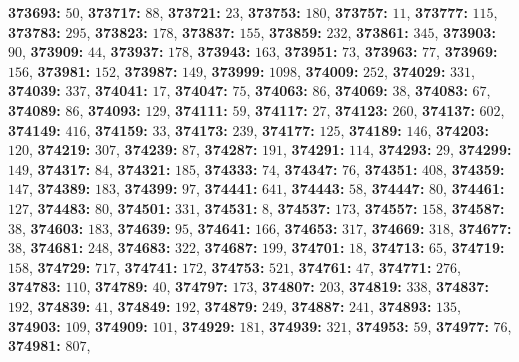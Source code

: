 \textsf{\bfseries 373693:} $50$, \textsf{\bfseries 373717:} $88$, \textsf{\bfseries 373721:} $23$, \textsf{\bfseries 373753:} $180$, \textsf{\bfseries 373757:} $11$, \textsf{\bfseries 373777:} $115$, \textsf{\bfseries 373783:} $295$, \textsf{\bfseries 373823:} $178$, \textsf{\bfseries 373837:} $155$, \textsf{\bfseries 373859:} $232$, \textsf{\bfseries 373861:} $345$, \textsf{\bfseries 373903:} $90$, \textsf{\bfseries 373909:} $44$, \textsf{\bfseries 373937:} $178$, \textsf{\bfseries 373943:} $163$, \textsf{\bfseries 373951:} $73$, \textsf{\bfseries 373963:} $77$, \textsf{\bfseries 373969:} $156$, \textsf{\bfseries 373981:} $152$, \textsf{\bfseries 373987:} $149$, \textsf{\bfseries 373999:} $1098$, \textsf{\bfseries 374009:} $252$, \textsf{\bfseries 374029:} $331$, \textsf{\bfseries 374039:} $337$, \textsf{\bfseries 374041:} $17$, \textsf{\bfseries 374047:} $75$, \textsf{\bfseries 374063:} $86$, \textsf{\bfseries 374069:} $38$, \textsf{\bfseries 374083:} $67$, \textsf{\bfseries 374089:} $86$, \textsf{\bfseries 374093:} $129$, \textsf{\bfseries 374111:} $59$, \textsf{\bfseries 374117:} $27$, \textsf{\bfseries 374123:} $260$, \textsf{\bfseries 374137:} $602$, \textsf{\bfseries 374149:} $416$, \textsf{\bfseries 374159:} $33$, \textsf{\bfseries 374173:} $239$, \textsf{\bfseries 374177:} $125$, \textsf{\bfseries 374189:} $146$, \textsf{\bfseries 374203:} $120$, \textsf{\bfseries 374219:} $307$, \textsf{\bfseries 374239:} $87$, \textsf{\bfseries 374287:} $191$, \textsf{\bfseries 374291:} $114$, \textsf{\bfseries 374293:} $29$, \textsf{\bfseries 374299:} $149$, \textsf{\bfseries 374317:} $84$, \textsf{\bfseries 374321:} $185$, \textsf{\bfseries 374333:} $74$, \textsf{\bfseries 374347:} $76$, \textsf{\bfseries 374351:} $408$, \textsf{\bfseries 374359:} $147$, \textsf{\bfseries 374389:} $183$, \textsf{\bfseries 374399:} $97$, \textsf{\bfseries 374441:} $641$, \textsf{\bfseries 374443:} $58$, \textsf{\bfseries 374447:} $80$, \textsf{\bfseries 374461:} $127$, \textsf{\bfseries 374483:} $80$, \textsf{\bfseries 374501:} $331$, \textsf{\bfseries 374531:} $8$, \textsf{\bfseries 374537:} $173$, \textsf{\bfseries 374557:} $158$, \textsf{\bfseries 374587:} $38$, \textsf{\bfseries 374603:} $183$, \textsf{\bfseries 374639:} $95$, \textsf{\bfseries 374641:} $166$, \textsf{\bfseries 374653:} $317$, \textsf{\bfseries 374669:} $318$, \textsf{\bfseries 374677:} $38$, \textsf{\bfseries 374681:} $248$, \textsf{\bfseries 374683:} $322$, \textsf{\bfseries 374687:} $199$, \textsf{\bfseries 374701:} $18$, \textsf{\bfseries 374713:} $65$, \textsf{\bfseries 374719:} $158$, \textsf{\bfseries 374729:} $717$, \textsf{\bfseries 374741:} $172$, \textsf{\bfseries 374753:} $521$, \textsf{\bfseries 374761:} $47$, \textsf{\bfseries 374771:} $276$, \textsf{\bfseries 374783:} $110$, \textsf{\bfseries 374789:} $40$, \textsf{\bfseries 374797:} $173$, \textsf{\bfseries 374807:} $203$, \textsf{\bfseries 374819:} $338$, \textsf{\bfseries 374837:} $192$, \textsf{\bfseries 374839:} $41$, \textsf{\bfseries 374849:} $192$, \textsf{\bfseries 374879:} $249$, \textsf{\bfseries 374887:} $241$, \textsf{\bfseries 374893:} $135$, \textsf{\bfseries 374903:} $109$, \textsf{\bfseries 374909:} $101$, \textsf{\bfseries 374929:} $181$, \textsf{\bfseries 374939:} $321$, \textsf{\bfseries 374953:} $59$, \textsf{\bfseries 374977:} $76$, \textsf{\bfseries 374981:} $807$, 
